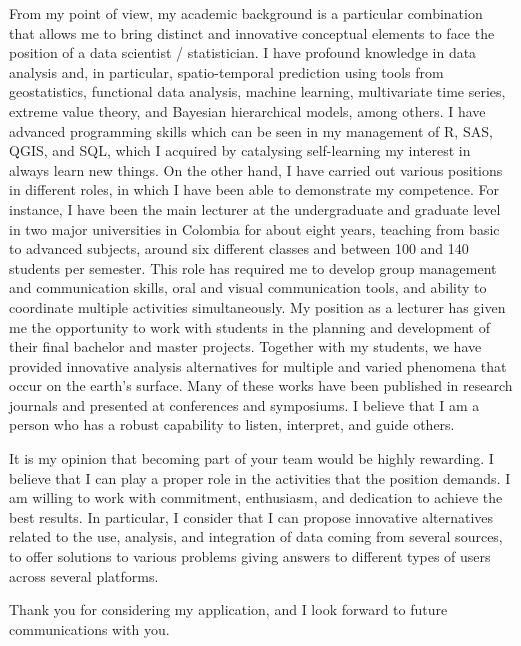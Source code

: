 \documentclass[11pt, a4paper]{awesome-cv}
\begin{document}
\begin{cvletter}
From my point of view, my academic background is a particular combination that allows me to bring distinct and innovative conceptual elements to face the position of a data scientist / statistician. I have profound knowledge in data analysis and, in particular, spatio-temporal prediction using tools from geostatistics, functional data analysis, machine learning, multivariate time series, extreme value theory, and  Bayesian hierarchical models, among others. I have advanced programming skills which can be seen in my management of R, SAS, QGIS, and SQL, which I acquired by catalysing self-learning my interest in always learn new things. On the other hand, I have carried out various positions in different roles, in which I have been able to demonstrate my competence. For instance, I have been the main lecturer at the undergraduate and graduate level in two major universities in Colombia for about eight years, teaching from basic to advanced subjects, around six different classes and between 100 and 140 students per semester. This role has required me to develop group management and communication skills, oral and visual communication tools, and ability to coordinate multiple activities simultaneously. My position as a lecturer has given me the opportunity to work with students in the planning and development of their final bachelor and master projects. Together with my students, we have provided innovative analysis alternatives for multiple and varied phenomena that occur on the earth's surface. Many of these works have been published in research journals and presented at conferences and symposiums. I believe that I am a person who has a robust capability to listen, interpret, and guide others. \par
It is my opinion that becoming part of your team would be highly rewarding. I believe that I can play a proper role in the activities that the position demands. I am willing to work with commitment, enthusiasm, and dedication to achieve the best results. In particular, I consider that I can propose innovative alternatives related to the use, analysis, and integration of data coming from several sources, to offer solutions to various problems giving answers to different types of users across several platforms.\par\bigskip

Thank you for considering my application, and I look forward to future communications with you.
\end{cvletter}


\makeletterclosing
\end{document}
